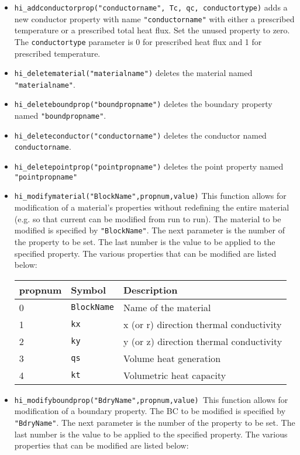\begin{itemize}
\item \texttt{hi\_addconductorprop("conductorname", Tc, qc, conductortype)} adds a new
conductor property with name \texttt{"conductorname"} with either a
prescribed temperature or a prescribed total heat flux. Set the unused
property to zero. The \texttt{conductortype} parameter is 0 for
prescribed heat flux and 1 for prescribed temperature.

\item \texttt{hi\_deletematerial("materialname")} deletes the material named
\texttt{"materialname"}.

\item \texttt{hi\_deleteboundprop("boundpropname")} deletes the boundary property
named \texttt{"boundpropname"}.

\item \texttt{hi\_deleteconductor("conductorname")} deletes the conductor named
\texttt{conductorname}.

\item \texttt{hi\_deletepointprop("pointpropname")} deletes the point property named
\texttt{"pointpropname"}

\item \texttt{hi\_modifymaterial("BlockName",propnum,value)} This function allows for
modification of a material's properties without redefining the
entire material (e.g. so that current can be modified from run to
run). The material to be modified is specified by
\texttt{"BlockName"}. The next parameter is the number of the
property to be set. The last number is the value to be applied to
the specified property. The various properties that can be modified
are listed below:

\begin{tabular}{lll}
propnum & Symbol &  Description \\ \hline
 0 & \texttt{BlockName} & Name of the material \\
 1 & \texttt{kx} & x (or r) direction thermal conductivity \\
 2 & \texttt{ky} & y (or z) direction thermal conductivity \\
 3 & \texttt{qs} & Volume heat generation \\
 4 & \texttt{kt} & Volumetric heat capacity 
\end{tabular}


\item \texttt{hi\_modifyboundprop("BdryName",propnum,value) }This function allows for
modification of a boundary property. The BC to be modified is specified by
\texttt{"BdryName"}. The next parameter is the number of the property to be
set. The last number is the value to be applied to the specified property.
The various properties that can be modified are listed below:


\end{itemize}
